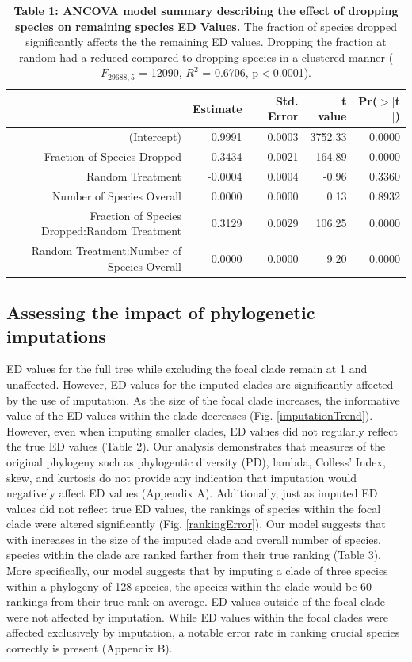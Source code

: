 \documentclass[12pt,english]{article}
\begin{document}
\begin{table}[ht]
  \centering
  \begin{tabular}{rrrrr}
    \hline
   & Estimate & Std. Error & t value & Pr($>$$|$t$|$) \\
    \hline
  (Intercept) & 0.9991 & 0.0003 & 3752.33 & 0.0000 \\
    Fraction of Species Dropped & -0.3434 & 0.0021 & -164.89 & 0.0000 \\
    Random Treatment & -0.0004 & 0.0004 & -0.96 & 0.3360 \\
    Number of Species Overall & 0.0000 & 0.0000 & 0.13 & 0.8932 \\
    Fraction of Species Dropped:Random Treatment & 0.3129 & 0.0029 & 106.25 & 0.0000 \\
    Random Treatment:Number of Species Overall & 0.0000 & 0.0000 & 9.20 & 0.0000 \\
     \hline
     \hline
  \end{tabular}
  \caption*{\textbf{Table 1: ANCOVA model summary describing the effect of 
  dropping species on remaining species ED Values.} The fraction of species 
  dropped significantly affects the the remaining ED values. Dropping the 
  fraction at random had a reduced compared to dropping species in a clustered 
  manner ($F_{29688, 5}$ = 12090, $R^{2}$ = 0.6706, p$<$0.0001).}
  \end{table}

\subsection*{Assessing the impact of phylogenetic imputations}

ED values for the full tree while excluding the focal clade remain at
1 and unaffected. However, ED values for the imputed clades are
significantly affected by the use of imputation. As the size of the
focal clade increases, the informative value of the ED values within the clade 
decreases (Fig. \ref{imputationTrend}). However, even when imputing smaller 
clades, ED values did not regularly reflect the true ED values (Table 2). 
Our analysis demonstrates that measures of the original phylogeny such as 
phylogentic diversity (PD), lambda, Colless' Index, skew, and kurtosis do not provide any 
indication that imputation would negatively affect ED values (Appendix A). Additionally, just as imputed 
ED values did not reflect true ED values, the rankings of species within the 
focal clade were altered significantly (Fig. \ref{rankingError}). Our model 
suggests that with increases in the size of the imputed clade and overall number 
of species, species within the clade are ranked farther from their true ranking 
(Table 3). More specifically, our model suggests that by imputing a clade of 
three species within a phylogeny of 128 species, the species within the clade 
would be 60 rankings from their true rank on average. ED values 
outside of the focal clade were not affected by imputation. While ED values 
within the focal clades were affected exclusively by imputation, a notable 
error rate in ranking crucial species correctly is present (Appendix B). 
\end{document}
